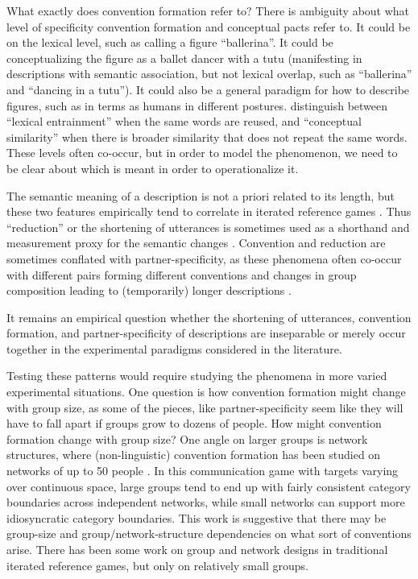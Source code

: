 \documentclass[]{article}
\begin{document}
What exactly does convention formation refer to? There is ambiguity about what level of specificity convention formation and conceptual pacts refer to. It could be on the lexical level, such as calling a figure ``ballerina''. It could be conceptualizing the figure as a ballet dancer with a tutu (manifesting in descriptions with semantic association, but not lexical overlap, such as ``ballerina'' and ``dancing in a tutu''). It could also be a general paradigm for how to describe figures, such as in terms as humans in different postures.  \citet{horton2002a} distinguish between ``lexical entrainment'' when the same words are reused, and ``conceptual similarity'' when there is broader similarity that does not repeat the same words. These levels often co-occur, but in order to model the phenomenon, we need to be clear about which is meant in order to operationalize it.  


The semantic meaning of a description is not a priori related to its length, but these two features empirically tend to correlate in iterated reference games \citep{hawkins2020b}.  Thus ``reduction'' or the shortening of utterances is sometimes used as a shorthand and measurement proxy for the semantic changes \citep{clark1986, hawkins2021}. Convention and reduction are sometimes conflated with partner-specificity, as these phenomena often co-occur with different pairs forming different conventions and changes in group composition leading to (temporarily) longer descriptions \citet{clark1986, wilkes-gibbs1992}. 

It remains an empirical question whether the shortening of utterances, convention formation, and partner-specificity of descriptions are inseparable or merely occur together in the experimental paradigms considered in the literature. 

Testing these patterns would require studying the phenomena in more varied experimental situations. One question is how convention formation might change with group size, as some of the pieces, like partner-specificity seem like they will have to fall apart if groups grow to dozens of people.  How might convention formation change with group size? One angle on larger groups is network structures, where (non-linguistic) convention formation has been studied on networks of up to 50 people \citep{guilbeault2021}. In this communication game with targets varying over continuous space, large groups tend to end up with fairly consistent category boundaries across independent networks, while small networks can support more idiosyncratic category boundaries. This work is suggestive that there may be group-size and group/network-structure dependencies on what sort of conventions arise. There has been some work on group and network designs in traditional iterated reference games, but only on relatively small groups. 
\end{document}
